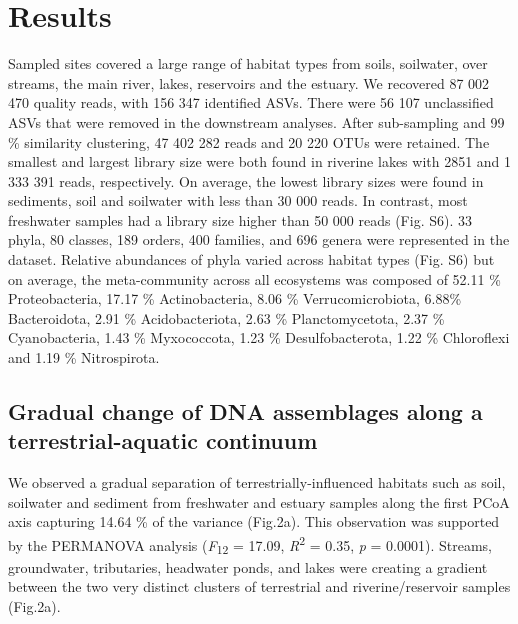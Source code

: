 \documentclass[12pt,a4paper]{article} %
\begin{document}
\section*{Results}
Sampled sites covered a large range of habitat types from soils, soilwater, over streams, the main river, lakes, reservoirs and the estuary. We recovered 87 002 470 quality reads, with 156 347 identified ASVs. There were 56 107 unclassified ASVs that were removed in the downstream analyses. After sub-sampling and 99 \% similarity clustering, 47 402 282 reads and 20 220 OTUs were retained. The smallest and largest library size were both found in riverine lakes with 2851 and 1 333 391 reads, respectively. On average, the lowest library sizes were found in sediments, soil and soilwater with less than 30 000 reads. In contrast, most freshwater samples had a library size higher than 50 000 reads (Fig. S6). 33 phyla, 80 classes,  189 orders, 400 families, and 696 genera were represented in the dataset. Relative abundances of phyla varied across habitat types (Fig. S6) but on average, the meta-community across all ecosystems was composed of 52.11 \% Proteobacteria, 17.17 \% Actinobacteria, 8.06 \% Verrucomicrobiota, 6.88\% Bacteroidota, 2.91 \% Acidobacteriota, 2.63 \% Planctomycetota, 2.37 \% Cyanobacteria, 1.43 \% Myxococcota, 1.23 \% Desulfobacterota, 1.22 \% Chloroflexi and 1.19 \% Nitrospirota.

\subsection*{Gradual change of DNA assemblages along a terrestrial-aquatic continuum}
We observed a gradual separation of terrestrially-influenced habitats such as soil, soilwater and sediment from freshwater and estuary samples along the first PCoA axis capturing 14.64 \% of the variance (Fig.2a). This observation was supported by the PERMANOVA analysis (\textit{F}\textsubscript{12} = 17.09, \textit{R}\textsuperscript{2} = 0.35, \textit{p} = 0.0001). Streams, groundwater, tributaries, headwater ponds, and lakes were creating a gradient between the two very distinct clusters of terrestrial and riverine/reservoir samples (Fig.2a).
\end{document}

